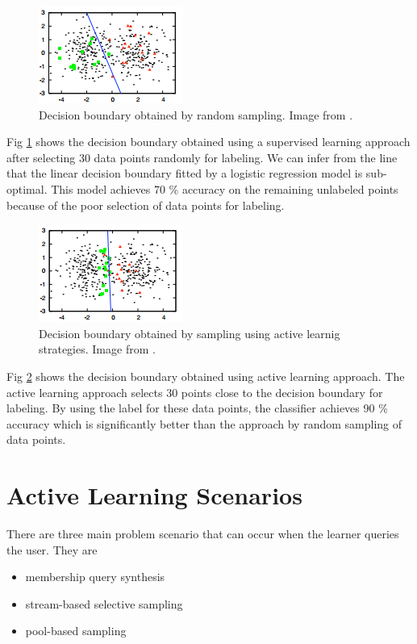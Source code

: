 \begin{figure}[h!]
	\centering
	\includegraphics[scale=1]{images/random_sampling}
	\caption{Decision boundary obtained by random sampling. Image from \cite{Settles2010}.}
	\label{random_sampling}
\end{figure}

Fig \ref{random_sampling} shows the decision boundary obtained using a supervised learning approach after selecting 30 data points randomly for labeling. We can infer from the line that the linear decision boundary fitted by a logistic regression model is sub-optimal. This model achieves 70 \% accuracy on the remaining unlabeled points because of the poor selection of data points for labeling.

\begin{figure}[h!]
	\centering
	\includegraphics[scale=1]{images/active_sampling}
	\caption{Decision boundary obtained by sampling using active learnig strategies. Image from \cite{Settles2010}.}
	\label{active_sampling}
\end{figure}


Fig \ref{active_sampling} shows the decision boundary obtained using active learning approach. The active learning approach selects 30 points close to the decision boundary for labeling. By using the label for these data points, the classifier achieves 90 \% accuracy which is significantly better than the approach by random sampling of data points. \cite{Settles2010}

\section{Active Learning Scenarios}

There are three main problem scenario that can occur when the learner queries the user. They are 
\begin{itemize}
	\item membership query synthesis
	\item stream-based selective sampling
	\item pool-based sampling
\end{itemize}

